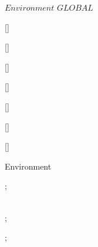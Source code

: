 \kClass $Environment$ \kISO $GLOBAL$
\par
\kInstanceVarDef
\parlinebr
\begin{insvar}
\end{insvar}
\begin{insvar}
[{\seq{}}]
\end{insvar}
\begin{insvar}
[{\seq{}}]
\end{insvar}
\begin{insvar}
[{\seq{}}]
\end{insvar}
\begin{insvar}
[{\True }]
\end{insvar}
\begin{insvar}
[{\True }]
\end{insvar}
\begin{insvar}
[{\seq{}}]
\end{insvar}
\begin{insvar}
[{}]
\end{insvar}
\par
\kOperations
{}\begin{op}[e]{Environment}%
\signature{String \Oto Environment}
\begin{blockstmt}
 ; \\
\begin{defstmt}
\end{defstmt} \\
 ; \\
\end{blockstmt};
\end{op}
